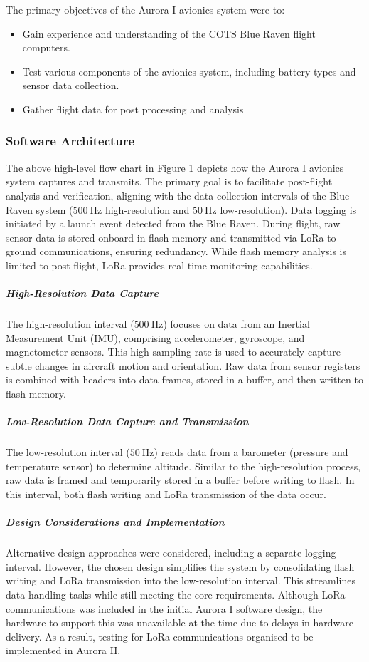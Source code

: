 The primary objectives of the Aurora I avionics system were to: 
\begin{itemize}
  \item Gain experience and understanding of the COTS Blue Raven flight computers. 
  \item Test various components of the avionics system, including battery types and sensor data collection. 
  \item Gather flight data for post processing and analysis
\end{itemize}

\subsubsection{Software Architecture}
The above high-level flow chart in Figure 1 depicts how the Aurora I avionics system captures and transmits. The primary goal is to facilitate post-flight analysis and verification, aligning with the data collection intervals of the Blue Raven system ($\SI{500}{\hertz}$ high-resolution and $\SI{50}{\hertz}$ low-resolution). Data logging is initiated by a launch event detected from the Blue Raven. During flight, raw sensor data is stored onboard in flash memory and transmitted via LoRa to ground communications, ensuring redundancy. While flash memory analysis is limited to post-flight, LoRa provides real-time monitoring capabilities. 

\subparagraph{High-Resolution Data Capture}

The high-resolution interval ($\SI{500}{\hertz}$) focuses on data from an Inertial Measurement Unit (IMU), comprising accelerometer, gyroscope, and magnetometer sensors. This high sampling rate is used to accurately capture subtle changes in aircraft motion and orientation. Raw data from sensor registers is combined with headers into data frames, stored in a buffer, and then written to flash memory. 

\subparagraph{Low-Resolution Data Capture and Transmission}

The low-resolution interval ($\SI{50}{\hertz}$) reads data from a barometer (pressure and temperature sensor) to determine altitude. Similar to the high-resolution process, raw data is framed and temporarily stored in a buffer before writing to flash. In this interval, both flash writing and LoRa transmission of the data occur. 

\subparagraph{Design Considerations and Implementation}

Alternative design approaches were considered, including a separate logging interval. However, the chosen design simplifies the system by consolidating flash writing and LoRa transmission into the low-resolution interval. This streamlines data handling tasks while still meeting the core requirements. Although LoRa communications was included in the initial Aurora I software design, the hardware to support this was unavailable at the time due to delays in hardware delivery. As a result, testing for LoRa communications organised to be implemented in Aurora II.  


